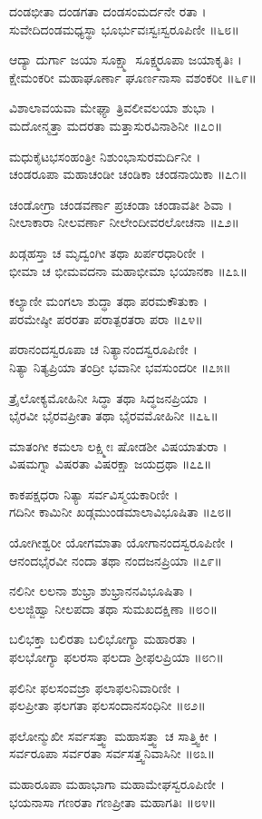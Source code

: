 ದಂಡಭೀತಾ ದಂಡಗತಾ ದಂಡಸಂಮರ್ದನೇ ರತಾ ।\\
ಸುವೇದಿದಂಡಮಧ್ಯಸ್ಥಾ ಭೂರ್ಭುವಃಸ್ವಃಸ್ವರೂಪಿಣೀ ॥೬೮॥

ಆದ್ಯಾ ದುರ್ಗಾ ಜಯಾ ಸೂಕ್ಷ್ಮಾ ಸೂಕ್ಷ್ಮರೂಪಾ ಜಯಾಕೃತಿಃ ।\\
ಕ್ಷೇಮಂಕರೀ ಮಹಾಘೂರ್ಣಾ ಘೂರ್ಣನಾಸಾ ವಶಂಕರೀ ॥೬೯॥

ವಿಶಾಲಾವಯವಾ ಮೇಘ್ಯಾ ತ್ರಿವಲೀವಲಯಾ ಶುಭಾ ।\\
ಮದೋನ್ಮತ್ತಾ ಮದರತಾ ಮತ್ತಾಸುರವಿನಾಶಿನೀ ॥೭೦॥

ಮಧುಕೈಟಭಸಂಹಂತ್ರೀ ನಿಶುಂಭಾಸುರಮರ್ದಿನೀ ।\\
ಚಂಡರೂಪಾ ಮಹಾಚಂಡೀ ಚಂಡಿಕಾ ಚಂಡನಾಯಿಕಾ ॥೭೧॥

ಚಂಡೋಗ್ರಾ ಚಂಡವರ್ಣಾ ಪ್ರಚಂಡಾ ಚಂಡಾವತೀ ಶಿವಾ ।\\
ನೀಲಾಕಾರಾ ನೀಲವರ್ಣಾ ನೀಲೇಂದೀವರಲೋಚನಾ ॥೭೨॥

ಖಡ್ಗಹಸ್ತಾ ಚ ಮೃದ್ವಂಗೀ ತಥಾ ಖರ್ಪರಧಾರಿಣೀ ।\\
ಭೀಮಾ ಚ ಭೀಮವದನಾ ಮಹಾಭೀಮಾ ಭಯಾನಕಾ ॥೭೩॥

ಕಲ್ಯಾಣೀ ಮಂಗಲಾ ಶುದ್ಧಾ ತಥಾ ಪರಮಕೌತುಕಾ ।\\
ಪರಮೇಷ್ಠೀ ಪರರತಾ ಪರಾತ್ಪರತರಾ ಪರಾ ॥೭೪॥

ಪರಾನಂದಸ್ವರೂಪಾ ಚ ನಿತ್ಯಾನಂದಸ್ವರೂಪಿಣೀ ।\\
ನಿತ್ಯಾ ನಿತ್ಯಪ್ರಿಯಾ ತಂದ್ರೀ ಭವಾನೀ ಭವಸುಂದರೀ ॥೭೫॥

ತ್ರೈಲೋಕ್ಯಮೋಹಿನೀ ಸಿದ್ಧಾ ತಥಾ ಸಿದ್ಧಜನಪ್ರಿಯಾ ।\\
ಭೈರವೀ ಭೈರವಪ್ರೀತಾ ತಥಾ ಭೈರವಮೋಹಿನೀ ॥೭೬॥

ಮಾತಂಗೀ ಕಮಲಾ ಲಕ್ಷ್ಮೀಃ ಷೋಡಶೀ ವಿಷಯಾತುರಾ ।\\
ವಿಷಮಗ್ನಾ ವಿಷರತಾ ವಿಷರಕ್ಷಾ ಜಯದ್ರಥಾ ॥೭೭॥

ಕಾಕಪಕ್ಷಧರಾ ನಿತ್ಯಾ ಸರ್ವವಿಸ್ಮಯಕಾರಿಣೀ ।\\
ಗದಿನೀ ಕಾಮಿನೀ ಖಡ್ಗಮುಂಡಮಾಲಾವಿಭೂಷಿತಾ ॥೭೮॥

ಯೋಗೀಶ್ವರೀ ಯೋಗಮಾತಾ ಯೋಗಾನಂದಸ್ವರೂಪಿಣೀ ।\\
ಆನಂದಭೈರವೀ ನಂದಾ ತಥಾ ನಂದಜನಪ್ರಿಯಾ ॥೭೯॥

ನಲಿನೀ ಲಲನಾ ಶುಭ್ರಾ ಶುಭ್ರಾನನವಿಭೂಷಿತಾ ।\\
ಲಲಜ್ಜಿಹ್ವಾ ನೀಲಪದಾ ತಥಾ ಸುಮಖದಕ್ಷಿಣಾ ॥೮೦॥

ಬಲಿಭಕ್ತಾ ಬಲಿರತಾ ಬಲಿಭೋಗ್ಯಾ ಮಹಾರತಾ ।\\
ಫಲಭೋಗ್ಯಾ ಫಲರಸಾ ಫಲದಾ ಶ್ರೀಫಲಪ್ರಿಯಾ ॥೮೧॥

ಫಲಿನೀ ಫಲಸಂವಜ್ರಾ ಫಲಾಫಲನಿವಾರಿಣೀ ।\\
ಫಲಪ್ರೀತಾ ಫಲಗತಾ ಫಲಸಂದಾನಸಂಧಿನೀ ॥೮೨॥

ಫಲೋನ್ಮುಖೀ ಸರ್ವಸತ್ತ್ವಾ ಮಹಾಸತ್ತ್ವಾ ಚ ಸಾತ್ತ್ವಿಕೀ ।\\
ಸರ್ವರೂಪಾ ಸರ್ವರತಾ ಸರ್ವಸತ್ತ್ವನಿವಾಸಿನೀ ॥೮೩॥

ಮಹಾರೂಪಾ ಮಹಾಭಾಗಾ ಮಹಾಮೇಘಸ್ವರೂಪಿಣೀ ।\\
ಭಯನಾಸಾ ಗಣರತಾ ಗಣಪ್ರೀತಾ ಮಹಾಗತಿಃ ॥೮೪॥

